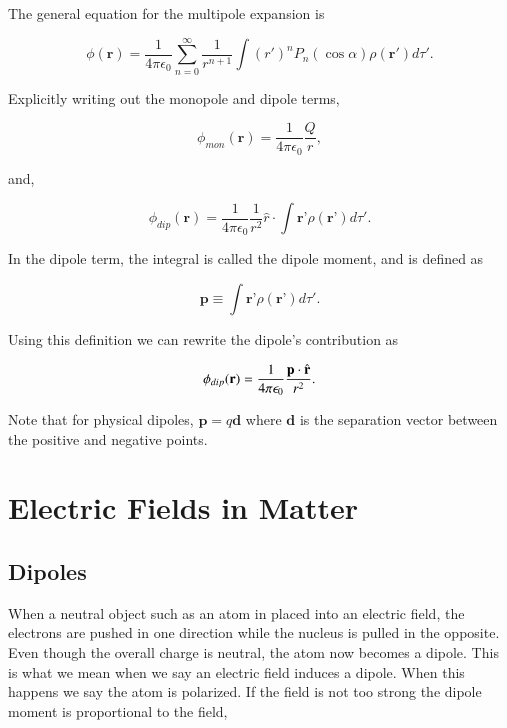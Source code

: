 \documentclass[preprint, review,12pt]{elsarticle}
\def\k{\frac{1}{4 \pi \epsilon_0}}
\def\.{\cdot}
\def\b{\textbf}
\def\={\equiv}
\newcommand{\hb}[1]{\hat{\b #1}}
\begin{document}
The general equation for the multipole expansion is

\begin{equation}
    \phi(\b{r}) = \frac{1}{4\pi \epsilon_0} \sum_{n=0}^\infty \frac{1}{r^{n+1}} \int (r')^n P_n(\cos \alpha ) \rho(\b{r}')d\tau'.
\end{equation}


Explicitly writing out the monopole and dipole terms,

\begin{equation}
    \phi_{mon}(\b{r}) = \k \frac{Q}{r},
\end{equation}

and,

\begin{equation}
    \phi_{dip}(\b{r}) = \frac{1}{4 \pi \epsilon_0}\frac{1}{r^2}\hat{r}\. \int \b{r'}\rho(\b{r'})d\tau'.
\end{equation}

In the dipole term, the integral is called the dipole moment, and is defined as

\begin{equation}
    \b{p} \= \int\b{r'} \rho(\b{r'})d\tau'.
\end{equation}

Using this definition we can rewrite the dipole's contribution as

\begin{equation}
    \phi_{dip}(\b{r}) = \k\frac{\b{p}\. \hb{r}}{r^2}.
\end{equation}

Note that for physical dipoles, $\b{p} = q\b{d}$ where $\b{d}$ is the separation vector between the positive and negative points.

\section{Electric Fields in Matter}

\subsection{Dipoles}

When a neutral object such as an atom in placed into an electric field, the electrons are pushed in one direction while the nucleus is pulled in the opposite. Even though the overall charge is neutral, the atom now becomes a dipole. This is what we mean when we say an electric field induces a dipole. When this happens we say the atom is polarized. If the field is not too strong the dipole moment is proportional to the field,
\end{document}
